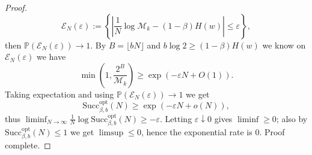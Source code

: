 \begin{proof}[Proof]
\[
\mathcal{E}_N(\varepsilon):=\left\{\left|\frac{1}{N}\log\mathcal{M}_k-(1-\beta)H(w)\right|\le \varepsilon\right\},
\]
then \(\mathbb{P}(\mathcal{E}_N(\varepsilon))\to 1\).
By \(B=\lfloor bN\rfloor\) and \(b\log 2\ge (1-\beta)H(w)\) we know on \(\mathcal{E}_N(\varepsilon)\) we have
\[
\min\!\left(1,\frac{2^B}{\mathcal{M}_k}\right)
\ge
\exp(-\varepsilon N+O(1)).
\]
Taking expectation and using \(\mathbb{P}(\mathcal{E}_N(\varepsilon))\to 1\) we get
\[
\mathrm{Succ}^{\mathrm{opt}}_{\beta,b}(N)\ge \exp(-\varepsilon N+o(N)),
\]
thus \(\liminf_{N\to\infty}\frac{1}{N}\log \mathrm{Succ}^{\mathrm{opt}}_{\beta,b}(N)\ge -\varepsilon\).
Letting \(\varepsilon\downarrow 0\) gives \(\liminf\ge 0\); also by \(\mathrm{Succ}^{\mathrm{opt}}_{\beta,b}(N)\le 1\) we get \(\limsup\le 0\), hence the exponential rate is \(0\).
Proof complete.
\end{proof}

